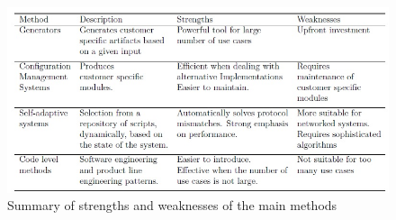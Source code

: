 \begin{figure}[h]
\centering
\includegraphics[width=.8\textwidth]{figure/figure14.jpg}
\caption{Summary of strengths and weaknesses of the main methods}
\label{fig:strenghtsWeaknesses}
\end{figure}




